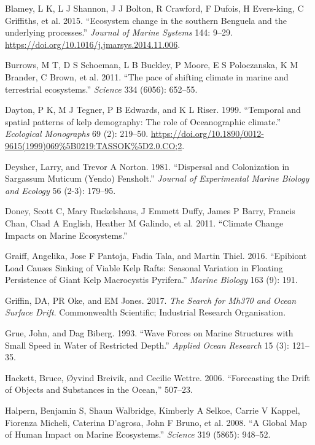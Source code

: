 \documentclass[
]{article}
\begin{document}
\leavevmode\hypertarget{ref-Blamey2015}{}%
Blamey, L K, L J Shannon, J J Bolton, R Crawford, F Dufois, H
Evers-king, C Griffiths, et al. 2015. ``Ecosystem change in the southern
Benguela and the underlying processes.'' \emph{Journal of Marine
Systems} 144: 9--29.
\url{https://doi.org/10.1016/j.jmarsys.2014.11.006}.

\leavevmode\hypertarget{ref-Burrows2011}{}%
Burrows, M T, D S Schoeman, L B Buckley, P Moore, E S Poloczanska, K M
Brander, C Brown, et al. 2011. ``The pace of shifting climate in marine
and terrestrial ecosystems.'' \emph{Science} 334 (6056): 652--55.

\leavevmode\hypertarget{ref-Dayton1999}{}%
Dayton, P K, M J Tegner, P B Edwards, and K L Riser. 1999. ``Temporal
and spatial patterns of kelp demography: The role of Oceanographic
climate.'' \emph{Ecological Monographs} 69 (2): 219--50.
\url{https://doi.org/10.1890/0012-9615(1999)069\%5B0219:TASSOK\%5D2.0.CO;2}.

\leavevmode\hypertarget{ref-deysher1981}{}%
Deysher, Larry, and Trevor A Norton. 1981. ``Dispersal and Colonization
in Sargassum Muticum (Yendo) Fensholt.'' \emph{Journal of Experimental
Marine Biology and Ecology} 56 (2-3): 179--95.

\leavevmode\hypertarget{ref-doney2011}{}%
Doney, Scott C, Mary Ruckelshaus, J Emmett Duffy, James P Barry, Francis
Chan, Chad A English, Heather M Galindo, et al. 2011. ``Climate Change
Impacts on Marine Ecosystems.''

\leavevmode\hypertarget{ref-graiff2016}{}%
Graiff, Angelika, Jose F Pantoja, Fadia Tala, and Martin Thiel. 2016.
``Epibiont Load Causes Sinking of Viable Kelp Rafts: Seasonal Variation
in Floating Persistence of Giant Kelp Macrocystis Pyrifera.''
\emph{Marine Biology} 163 (9): 191.

\leavevmode\hypertarget{ref-griffin2017}{}%
Griffin, DA, PR Oke, and EM Jones. 2017. \emph{The Search for Mh370 and
Ocean Surface Drift}. Commonwealth Scientific; Industrial Research
Organisation.

\leavevmode\hypertarget{ref-grue1993}{}%
Grue, John, and Dag Biberg. 1993. ``Wave Forces on Marine Structures
with Small Speed in Water of Restricted Depth.'' \emph{Applied Ocean
Research} 15 (3): 121--35.

\leavevmode\hypertarget{ref-hackett2006}{}%
Hackett, Bruce, Øyvind Breivik, and Cecilie Wettre. 2006. ``Forecasting
the Drift of Objects and Substances in the Ocean,'' 507--23.

\leavevmode\hypertarget{ref-halpern2008}{}%
Halpern, Benjamin S, Shaun Walbridge, Kimberly A Selkoe, Carrie V
Kappel, Fiorenza Micheli, Caterina D'agrosa, John F Bruno, et al. 2008.
``A Global Map of Human Impact on Marine Ecosystems.'' \emph{Science}
319 (5865): 948--52.
\end{document}
